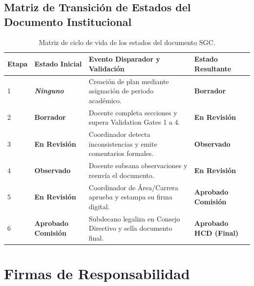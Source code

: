 \documentclass[12pt,a4paper]{article}
\begin{document}
\subsection{Matriz de Transición de Estados del Documento Institucional}
\begin{table}[H]
\centering
\small
\renewcommand{\arraystretch}{1.2}
\begin{tabularx}{\textwidth}{|>{\hsize=0.3\hsize\centering\arraybackslash\footnotesize}X|>{\hsize=0.9\hsize\raggedright\arraybackslash\bfseries\footnotesize}X|>{\hsize=1.4\hsize\raggedright\arraybackslash\footnotesize}X|>{\hsize=1.4\hsize\raggedright\arraybackslash\footnotesize}X|}
\hline
\rowcolor{tableheader}
\textbf{Etapa} & \textbf{Estado Inicial} & \textbf{Evento Disparador y Validación} & \textbf{Estado Resultante} \\
\hline
1 & \textit{Ninguno} & Creación de plan mediante asignación de periodo académico. & \textbf{Borrador} \\
\hline
2 & \textbf{Borrador} & Docente completa secciones y supera Validation Gates 1 a 4. & \textbf{En Revisión} \\
\hline
3 & \textbf{En Revisión} & Coordinador detecta inconsistencias y emite comentarios formales. & \textbf{Observado} \\
\hline
4 & \textbf{Observado} & Docente subsana observaciones y reenvía el documento. & \textbf{En Revisión} \\
\hline
5 & \textbf{En Revisión} & Coordinador de Área/Carrera aprueba y estampa su firma digital. & \textbf{Aprobado Comisión} \\
\hline
6 & \textbf{Aprobado Comisión} & Subdecano legaliza en Consejo Directivo y sella documento final. & \textbf{Aprobado HCD (Final)} \\
\hline
\end{tabularx}
\caption{Matriz de ciclo de vida de los estados del documento SGC.}
\end{table}

\section{Firmas de Responsabilidad}
\end{document}
